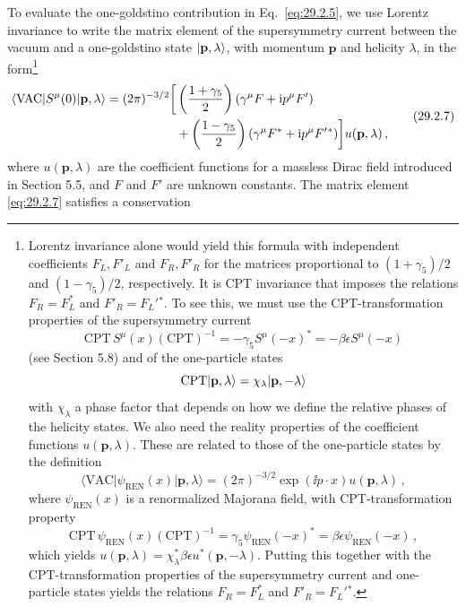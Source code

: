 To evaluate the one-goldstino contribution in Eq.~\eqref{eq:29.2.5}, we
use Lorentz invariance to write the matrix element of the supersymmetry
current between the vacuum and a one-goldstino state
\(\lvert \mathbf p,\lambda\rangle\), with momentum \(\mathbf p\) and
helicity \(\lambda\), in the form\footnote{Lorentz invariance alone would
yield this formula with independent coefficients \(F_L,F'_L\) and
\(F_R,F'_R\) for the matrices proportional to \((1+\gamma_5)/2\) and
\((1-\gamma_5)/2\), respectively. It is CPT invariance that imposes the
relations \(F_R=F_L^*\) and \(F'_R=F_L'{}^*\). To see this, we must use the
CPT-transformation properties of the supersymmetry current
\[
  \mathrm{CPT}\,S^\mu(x)(\mathrm{CPT})^{-1}
  =-\gamma_5S^\mu(-x)^*
  =-\beta\epsilon S^\mu(-x)
\]
(see Section 5.8) and of the one-particle states
\[
  \mathrm{CPT}\lvert \mathbf p,\lambda\rangle
  =\chi_\lambda\lvert \mathbf p,-\lambda\rangle
\]
with \(\chi_\lambda\) a phase factor that depends on how we define the
relative phases of the helicity states. We also need the reality
properties of the coefficient functions \(u(\mathbf p,\lambda)\). These
are related to those of the one-particle states by the definition
\[
  \langle\mathrm{VAC}\lvert\psi_{\mathrm{REN}}(x)
  \rvert\mathbf p,\lambda\rangle
  =(2\pi)^{-3/2}\exp(\ii p\mathbin{\cdot}x)u(\mathbf p,\lambda)\,,
\]
where \(\psi_{\mathrm{REN}}(x)\) is a renormalized Majorana field, with
CPT-transformation property
\[
  \mathrm{CPT}\,\psi_{\mathrm{REN}}(x)(\mathrm{CPT})^{-1}
  =\gamma_5\psi_{\mathrm{REN}}(-x)^*
  =\beta\epsilon\psi_{\mathrm{REN}}(-x)\,,
\]
which yields
\(u(\mathbf p,\lambda)=\chi_\lambda^*\beta\epsilon
u^*(\mathbf p,-\lambda)\). Putting this together with the
CPT-transformation properties of the supersymmetry current and
one-particle states yields the relations \(F_R=F_L^*\) and
\(F'_R=F_L'{}^*\).}
\begin{equation}
  \begin{aligned}
  \langle \mathrm{VAC}\rvert S^\mu(0)\lvert \mathbf p,\lambda\rangle
  =(2\pi)^{-3/2}
  \biggl[
    &\left(\frac{1+\gamma_5}{2}\right)
      \left(\gamma^\mu F+\mathrm{i} p^\mu F'\right)
  \\
    &+\left(\frac{1-\gamma_5}{2}\right)
      \left(\gamma^\mu F^*+\mathrm{i} p^\mu F'{}^*\right)
  \biggr]u(\mathbf p,\lambda)\,,
  \end{aligned}
  \tag{29.2.7}\label{eq:29.2.7}
\end{equation}
where \(u(\mathbf p,\lambda)\) are the coefficient functions for a massless
Dirac field introduced in Section 5.5, and \(F\) and \(F'\) are unknown
constants. The matrix element \eqref{eq:29.2.7} satisfies a conservation
